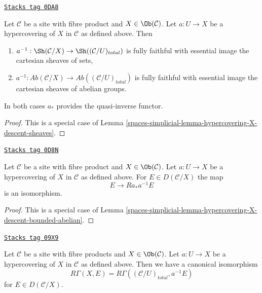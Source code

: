 \begin{lemma}
\label{spaces-simplicial-lemma-hypercovering-X-simple-descent-sheaves}
\href{https://stacks.math.columbia.edu/tag/0DA8}{\texttt{Stacks tag 0DA8}}

Let $\mathcal{C}$ be a site with fibre product and $X \in \Ob(\mathcal{C})$.
Let $a : U \to X$ be a hypercovering of $X$ in $\mathcal{C}$ as defined above.
Then
\begin{enumerate}
\item $a^{-1} : \Sh(\mathcal{C}/X) \to \Sh((\mathcal{C}/U)_{total})$
is fully faithful with essential image the cartesian sheaves of sets,
\item $a^{-1} : \textit{Ab}(\mathcal{C}/X) \to
\textit{Ab}((\mathcal{C}/U)_{total})$
is fully faithful with essential image the cartesian sheaves
of abelian groups.
\end{enumerate}
In both cases $a_*$ provides the quasi-inverse functor.
\end{lemma}

\begin{proof}
This is a special case of
Lemma \ref{spaces-simplicial-lemma-hypercovering-X-descent-sheaves}.
\end{proof}

\begin{lemma}
\label{spaces-simplicial-lemma-hypercovering-X-simple-descent-bounded-abelian}
\href{https://stacks.math.columbia.edu/tag/0D8N}{\texttt{Stacks tag 0D8N}}

Let $\mathcal{C}$ be a site with fibre product and $X \in \Ob(\mathcal{C})$.
Let $a : U \to X$ be a hypercovering of $X$ in $\mathcal{C}$ as defined above.
For $E \in D(\mathcal{C}/X)$ the map
$$
E \longrightarrow Ra_*a^{-1}E
$$
is an isomorphism.
\end{lemma}

\begin{proof}
This is a special case of
Lemma \ref{spaces-simplicial-lemma-hypercovering-X-descent-bounded-abelian}.
\end{proof}

\begin{lemma}
\label{spaces-simplicial-lemma-compare-cohomology-hypercovering-X-simple}
\href{https://stacks.math.columbia.edu/tag/09X9}{\texttt{Stacks tag 09X9}}

Let $\mathcal{C}$ be a site with fibre products and $X \in \Ob(\mathcal{C})$.
Let $a : U \to X$ be a hypercovering of $X$ in $\mathcal{C}$ as defined above.
Then we have a canonical isomorphism
$$
R\Gamma(X, E) = R\Gamma((\mathcal{C}/U)_{total}, a^{-1}E)
$$
for $E \in D(\mathcal{C}/X)$.
\end{lemma}

